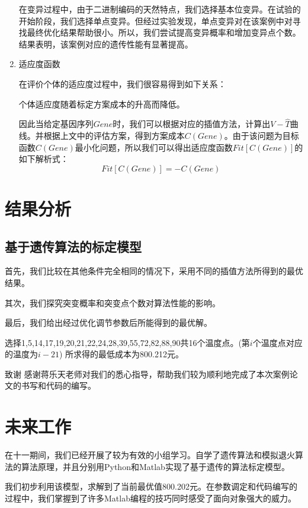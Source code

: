 \documentclass[10.5pt,twocolumn]{jbuaa}
\begin{document}
\begin{enumerate}[label=(\roman*)]
在变异过程中，由于二进制编码的天然特点，我们选择基本位变异。在试验的开始阶段，我们选择单点变异。但经过实验发现，单点变异对在该案例中对寻找最终优化结果帮助很小。所以，我们尝试提高变异概率和增加变异点个数。结果表明，该案例对应的遗传性能有显著提高。
\item \hei 适应度函数
\normalfont

在评价个体的适应度过程中，我们很容易得到如下关系：

\kai 个体适应度随着标定方案成本的升高而降低。

\normalfont 因此当给定基因序列$Gene$时，我们可以根据对应的插值方法，计算出$V-\hat T$曲线。并根据上文中的评估方案，得到方案成本$C(Gene)$。由于该问题为目标函数$C(Gene)$最小化问题，所以我们可以得出适应度函数$Fit[C(Gene)]$的如下解析式：
\begin{equation}
	Fit[C(Gene)] = - C(Gene)
\end{equation}
\end{enumerate}



\section{结果分析}
\subsection{基于遗传算法的标定模型}
首先，我们比较在其他条件完全相同的情况下，采用不同的插值方法所得到的最优结果。

其次，我们探究突变概率和突变点个数对算法性能的影响。

最后，我们给出经过优化调节参数后所能得到的最优解。
\begin{flushleft}
	\kai 
选择1,5,14,17,19,20,21,22,24,28,39,55,72,82,88,90共16个温度点。(第$i$个温度点对应的温度为$i - 21$) 所求得的最低成本为800.212元。
\end{flushleft}
\vspace{1em}

{\hei\wuhao 致谢\quad}
{\fang\wuhao 
感谢蒋乐天老师对我们的悉心指导，帮助我们较为顺利地完成了本次案例论文的书写和代码的编写。
}
\section{未来工作}
在十一期间，我们已经开展了较为有效的小组学习。自学了遗传算法和模拟退火算法的算法原理，并且分别用Python和Matlab实现了基于遗传的算法标定模型。

我们初步利用该模型，求解到了当前最优值800.202元。在参数调定和代码编写的过程中，我们掌握到了许多Matlab编程的技巧同时感受了面向对象强大的威力。
\end{document}
